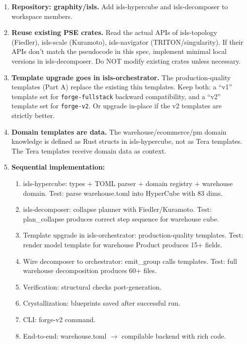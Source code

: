 \documentclass[11pt,a4paper]{article}
\begin{document}
\begin{enumerate}
\item \textbf{Repository: graphity/isls.} Add isls-hypercube and
  isls-decomposer to workspace members.

\item \textbf{Reuse existing PSE crates.} Read the actual APIs of
  isls-topology (Fiedler), isls-scale (Kuramoto), isls-navigator
  (TRITON/singularity). If their APIs don't match the pseudocode
  in this spec, implement minimal local versions in
  isls-decomposer. Do NOT modify existing crates unless necessary.

\item \textbf{Template upgrade goes in isls-orchestrator.} The
  production-quality templates (Part A) replace the existing thin
  templates. Keep both: a ``v1'' template set for \texttt{forge-fullstack}
  backward compatibility, and a ``v2'' template set for \texttt{forge-v2}.
  Or upgrade in-place if the v2 templates are strictly better.

\item \textbf{Domain templates are data.} The warehouse/ecommerce/pm
  domain knowledge is defined as Rust structs in isls-hypercube,
  not as Tera templates. The Tera templates receive domain data
  as context.

\item \textbf{Sequential implementation:}
  \begin{enumerate}
  \item isls-hypercube: types + TOML parser + domain registry + warehouse domain.
    Test: parse warehouse.toml into HyperCube with 83 dims.
  \item isls-decomposer: collapse planner with Fiedler/Kuramoto.
    Test: plan\_collapse produces correct step sequence for warehouse cube.
  \item Template upgrade in isls-orchestrator: production-quality templates.
    Test: render model template for warehouse Product produces 15+ fields.
  \item Wire decomposer to orchestrator: emit\_group calls templates.
    Test: full warehouse decomposition produces 60+ files.
  \item Verification: structural checks post-generation.
  \item Crystallization: blueprints saved after successful run.
  \item CLI: forge-v2 command.
  \item End-to-end: warehouse.toml $\to$ compilable backend with rich code.
  \end{enumerate}


\end{enumerate}
\end{document}
